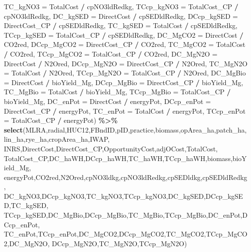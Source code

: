 \documentclass[
]{article}
\newenvironment{Shaded}{\begin{snugshade}}{\end{snugshade}}
\newcommand{\AttributeTok}[1]{\textcolor[rgb]{0.13,0.29,0.53}{#1}}
\newcommand{\FunctionTok}[1]{\textcolor[rgb]{0.13,0.29,0.53}{\textbf{#1}}}
\newcommand{\NormalTok}[1]{#1}
\newcommand{\SpecialCharTok}[1]{\textcolor[rgb]{0.81,0.36,0.00}{\textbf{#1}}}
\begin{document}
\begin{Shaded}
\begin{Highlighting}[]
         \AttributeTok{TC\_kgNO3 =}\NormalTok{ TotalCost }\SpecialCharTok{/}\NormalTok{ cpNO3ldRedkg,}
         \AttributeTok{TCcp\_kgNO3 =}\NormalTok{ TotalCost\_CP }\SpecialCharTok{/}\NormalTok{ cpNO3ldRedkg,}
         \AttributeTok{DC\_kgSED =}\NormalTok{ DirectCost }\SpecialCharTok{/}\NormalTok{ cpSEDldRedkg,}
         \AttributeTok{DCcp\_kgSED =}\NormalTok{ DirectCost\_CP }\SpecialCharTok{/}\NormalTok{ cpSEDldRedkg,}
         \AttributeTok{TC\_kgSED =}\NormalTok{ TotalCost }\SpecialCharTok{/}\NormalTok{ cpSEDldRedkg,}
         \AttributeTok{TCcp\_kgSED =}\NormalTok{ TotalCost\_CP }\SpecialCharTok{/}\NormalTok{ cpSEDldRedkg,}
         \AttributeTok{DC\_MgCO2 =}\NormalTok{ DirectCost }\SpecialCharTok{/}\NormalTok{ CO2red,}
         \AttributeTok{DCcp\_MgCO2 =}\NormalTok{ DirectCost\_CP }\SpecialCharTok{/}\NormalTok{ CO2red,}
         \AttributeTok{TC\_MgCO2 =}\NormalTok{ TotalCost }\SpecialCharTok{/}\NormalTok{ CO2red,}
         \AttributeTok{TCcp\_MgCO2 =}\NormalTok{ TotalCost\_CP }\SpecialCharTok{/}\NormalTok{ CO2red,}
         \AttributeTok{DC\_MgN2O =}\NormalTok{ DirectCost }\SpecialCharTok{/}\NormalTok{ N2Ored,}
         \AttributeTok{DCcp\_MgN2O =}\NormalTok{ DirectCost\_CP }\SpecialCharTok{/}\NormalTok{ N2Ored,}
         \AttributeTok{TC\_MgN2O =}\NormalTok{ TotalCost }\SpecialCharTok{/}\NormalTok{ N2Ored,}
         \AttributeTok{TCcp\_MgN2O =}\NormalTok{ TotalCost\_CP }\SpecialCharTok{/}\NormalTok{ N2Ored,}
         \AttributeTok{DC\_MgBio =}\NormalTok{ DirectCost }\SpecialCharTok{/}\NormalTok{ bioYield\_Mg,}
         \AttributeTok{DCcp\_MgBio =}\NormalTok{ DirectCost\_CP }\SpecialCharTok{/}\NormalTok{ bioYield\_Mg,}
         \AttributeTok{TC\_MgBio =}\NormalTok{ TotalCost }\SpecialCharTok{/}\NormalTok{ bioYield\_Mg,}
         \AttributeTok{TCcp\_MgBio =}\NormalTok{ TotalCost\_CP }\SpecialCharTok{/}\NormalTok{ bioYield\_Mg,}
         \AttributeTok{DC\_enPot =}\NormalTok{ DirectCost }\SpecialCharTok{/}\NormalTok{ energyPot,}
         \AttributeTok{DCcp\_enPot =}\NormalTok{ DirectCost\_CP }\SpecialCharTok{/}\NormalTok{ energyPot,}
         \AttributeTok{TC\_enPot =}\NormalTok{ TotalCost }\SpecialCharTok{/}\NormalTok{ energyPot,}
         \AttributeTok{TCcp\_enPot =}\NormalTok{ TotalCost\_CP }\SpecialCharTok{/}\NormalTok{ energyPot) }\SpecialCharTok{\%\textgreater{}\%}
  \FunctionTok{select}\NormalTok{(MLRA,radial,HUC12,FBndID,pID,practice,biomass,opArea\_ha,patch\_ha,}
\NormalTok{         lin\_ha,rye\_ha,cropArea\_ha,IWAP,}
\NormalTok{         INRS,DirectCost,DirectCost\_CP,OpportunityCost,adjOCost,TotalCost,}
\NormalTok{         TotalCost\_CP,DC\_haWH,DCcp\_haWH,TC\_haWH,TCcp\_haWH,biomass,bioYield\_Mg,}
\NormalTok{         energyPot,CO2red,N2Ored,cpNO3ldkg,cpNO3ldRedkg,cpSEDldkg,cpSEDldRedkg,}
\NormalTok{         DC\_kgNO3,DCcp\_kgNO3,TC\_kgNO3,TCcp\_kgNO3,DC\_kgSED,DCcp\_kgSED,TC\_kgSED,}
\NormalTok{         TCcp\_kgSED,DC\_MgBio,DCcp\_MgBio,TC\_MgBio,TCcp\_MgBio,DC\_enPot,DCcp\_enPot,}
\NormalTok{         TC\_enPot,TCcp\_enPot,DC\_MgCO2,DCcp\_MgCO2,TC\_MgCO2,TCcp\_MgCO2,DC\_MgN2O,}
\NormalTok{         DCcp\_MgN2O,TC\_MgN2O,TCcp\_MgN2O)}
\end{Highlighting}
\end{Shaded}
\end{document}
